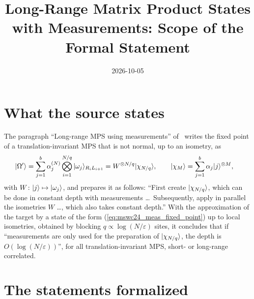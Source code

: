\documentclass{article}
\title{Long-Range Matrix Product States with Measurements: Scope of the Formal Statement}
\author{}
\date{2026-10-05}
\begin{document}
\maketitle
{}

\section{What the source states}
The paragraph ``Long-range MPS using measurements'' of~\cite{Malz2024Preparation}
writes the fixed point of a translation-invariant MPS that is not normal, up to
an isometry, as
\begin{align}
    |\Omega'\rangle
     & =\sum_{j=1}^b\alpha_j^{(N)}\bigotimes_{i=1}^{N/q}|\omega_j\rangle_{R_iL_{i+1}}
    =W^{\otimes N/q}|\chi_{N/q}\rangle,\qquad
    |\chi_M\rangle=\sum_{j=1}^b\alpha_j|j\rangle^{\otimes M},
    \label{eq:mswc24_meas_fixed_point}
\end{align}
with $W\colon|j\rangle\mapsto|\omega_j\rangle$, and prepares it as follows: ``First
create $|\chi_{N/q}\rangle$, which can be done in constant depth with
measurements \ldots\ Subsequently, apply in parallel the isometries $W$ \ldots,
which also takes constant depth.'' With the approximation of the target by a
state of the form (\ref{eq:mswc24_meas_fixed_point}) up to local isometries,
obtained by blocking $q\propto\log(N/\varepsilon)$ sites, it concludes that if
``measurements are only used for the preparation of $|\chi_{N/q}\rangle$, the
depth is $O(\log(N/\varepsilon))$'', for all translation-invariant MPS, short-
or long-range correlated.

\section{The statements formalized}
\end{document}
